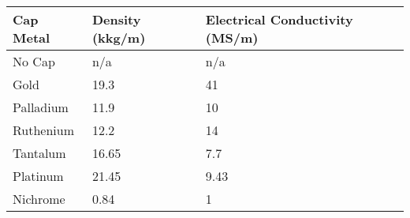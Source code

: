 \documentclass[12]{article}
\begin{document}
\begin{table}[H]
\centering
\begin{tabular}{l|l|l}
Cap Metal & Density (kkg/m) & Electrical Conductivity (MS/m) \\ \hline
No Cap    & n/a             & n/a                        \\
Gold      & 19.3            & 41                         \\
Palladium & 11.9            & 10                         \\
Ruthenium & 12.2            & 14                         \\
Tantalum  & 16.65           & 7.7                        \\
Platinum  & 21.45           & 9.43                       \\
Nichrome  & 0.84            & 1                         
\end{tabular}
\end{table}


\cleardoublepage
\end{document}
